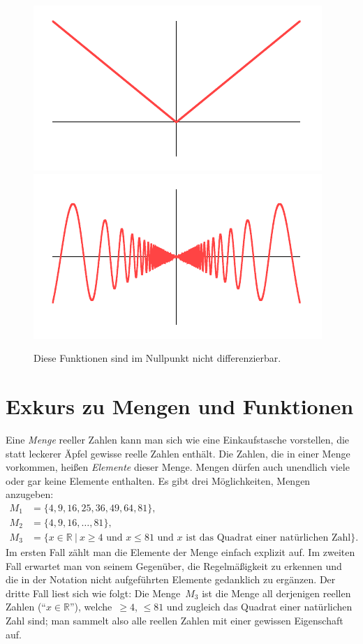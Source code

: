\documentclass{zirkelblatt}
\newcommand{\RR}{\mathbb{R}}
\theoremstyle{definition}
\theoremstyle{plain}
\theoremstyle{remark}
\begin{document}
\begin{figure}[b]
  \centering
  \includegraphics{sdg-nicht-diffbar1}
  \includegraphics{sdg-nicht-diffbar2}
  \caption{\label{fig:nicht-diffbar}Diese Funktionen sind im Nullpunkt nicht
  differenzierbar.}
\end{figure}


\section{Exkurs zu Mengen und Funktionen}

Eine \emph{Menge} reeller Zahlen kann man sich wie eine Einkaufstasche
vorstellen, die statt leckerer Äpfel gewisse reelle Zahlen enthält. Die Zahlen,
die in einer Menge vorkommen, heißen \emph{Elemente} dieser Menge. Mengen
dürfen auch unendlich viele oder gar keine Elemente enthalten. Es gibt drei
Möglichkeiten, Mengen anzugeben:
\begin{align*}
  M_1 &= \{ 4, 9, 16, 25, 36, 49, 64, 81 \}, \\
  M_2 &= \{ 4, 9, 16, \ldots, 81 \}, \\
  M_3 &= \{ x \in \RR \ |\ \text{$x \geq 4$ und $x \leq 81$ und $x$ ist das Quadrat
  einer natürlichen Zahl} \}.
\end{align*}
Im ersten Fall zählt man die Elemente der Menge einfach explizit auf. Im
zweiten Fall erwartet man von seinem Gegenüber, die Regelmäßigkeit zu erkennen
und die in der Notation nicht aufgeführten Elemente gedanklich zu ergänzen. Der
dritte Fall liest sich wie folgt: Die Menge~$M_3$ ist die Menge all derjenigen
reellen Zahlen ("`$x \in \RR$"'), welche~$\geq 4$, $\leq 81$ und zugleich das
Quadrat einer natürlichen Zahl sind; man sammelt also alle reellen Zahlen mit
einer gewissen Eigenschaft auf.
\end{document}
